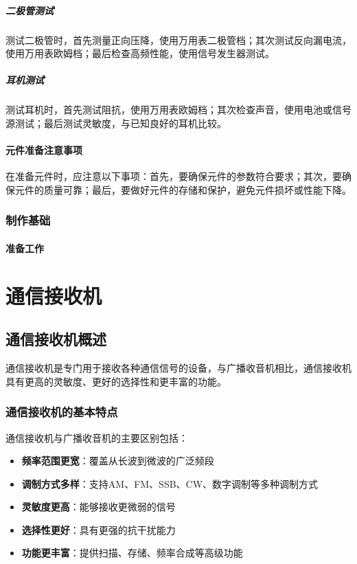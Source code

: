 \documentclass[12pt,UTF8]{ctexbook}
\begin{document}
\subsubsection{二极管测试}
测试二极管时，首先测量正向压降，使用万用表二极管档；其次测试反向漏电流，使用万用表欧姆档；最后检查高频性能，使用信号发生器测试。

\subsubsection{耳机测试}
测试耳机时，首先测试阻抗，使用万用表欧姆档；其次检查声音，使用电池或信号源测试；最后测试灵敏度，与已知良好的耳机比较。

\subsection{元件准备注意事项}

在准备元件时，应注意以下事项：首先，要确保元件的参数符合要求；其次，要确保元件的质量可靠；最后，要做好元件的存储和保护，避免元件损坏或性能下降。

\section{制作基础}

\subsection{准备工作}

\part{通信接收机}

\chapter{通信接收机概述}

通信接收机是专门用于接收各种通信信号的设备，与广播收音机相比，通信接收机具有更高的灵敏度、更好的选择性和更丰富的功能。

\section{通信接收机的基本特点}

通信接收机与广播收音机的主要区别包括：

\begin{itemize}[leftmargin=3.5em]
    \item \textbf{频率范围更宽}：覆盖从长波到微波的广泛频段
    \item \textbf{调制方式多样}：支持AM、FM、SSB、CW、数字调制等多种调制方式
    \item \textbf{灵敏度更高}：能够接收更微弱的信号
    \item \textbf{选择性更好}：具有更强的抗干扰能力
    \item \textbf{功能更丰富}：提供扫描、存储、频率合成等高级功能
\end{itemize}
\end{document}
